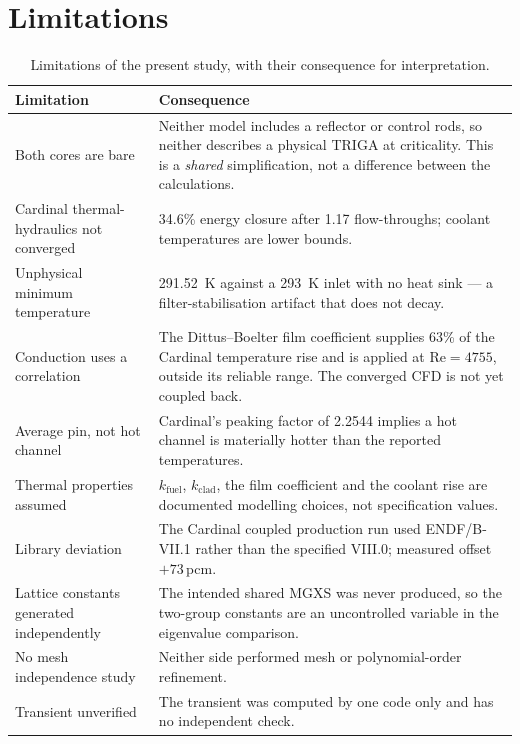 \documentclass[11pt,a4paper]{article}
\newcommand{\pcm}{\,pcm}
\begin{document}
\section{Limitations}
\begin{table}[H]\centering\small
\caption{Limitations of the present study, with their consequence for interpretation.}
\begin{tabular}{@{}p{48mm}p{88mm}@{}}
\toprule
\textbf{Limitation} & \textbf{Consequence}\\
\midrule
Both cores are bare & Neither model includes a reflector or control rods, so neither
describes a physical TRIGA at criticality. This is a \emph{shared} simplification, not a
difference between the calculations.\\
Cardinal thermal-hydraulics not converged & 34.6\% energy closure after 1.17 flow-throughs;
coolant temperatures are lower bounds.\\
Unphysical minimum temperature & \SI{291.52}{\kelvin} against a \SI{293}{\kelvin} inlet with
no heat sink --- a filter-stabilisation artifact that does not decay.\\
Conduction uses a correlation & The Dittus--Boelter film coefficient supplies 63\% of the
Cardinal temperature rise and is applied at $\mathrm{Re}=4755$, outside its reliable range.
The converged CFD is not yet coupled back.\\
Average pin, not hot channel & Cardinal's peaking factor of 2.2544 implies a hot channel is
materially hotter than the reported temperatures.\\
Thermal properties assumed & $k_{\text{fuel}}$, $k_{\text{clad}}$, the film coefficient and
the coolant rise are documented modelling choices, not specification values.\\
Library deviation & The Cardinal coupled production run used ENDF/B-VII.1 rather than the
specified VIII.0; measured offset $+73$\pcm.\\
Lattice constants generated independently & The intended shared MGXS was never produced, so
the two-group constants are an uncontrolled variable in the eigenvalue comparison.\\
No mesh independence study & Neither side performed mesh or polynomial-order refinement.\\
Transient unverified & The transient was computed by one code only and has no independent
check.\\
\bottomrule
\end{tabular}
\end{table}
\end{document}
